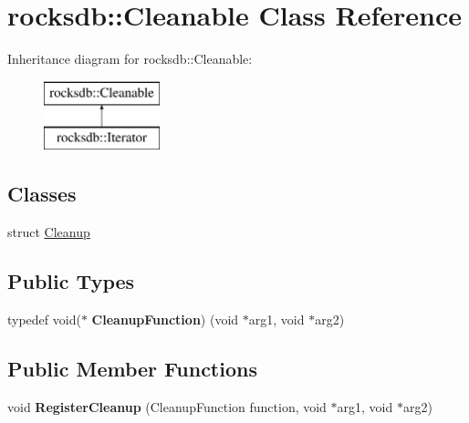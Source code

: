 \hypertarget{classrocksdb_1_1Cleanable}{}\section{rocksdb\+:\+:Cleanable Class Reference}
\label{classrocksdb_1_1Cleanable}
Inheritance diagram for rocksdb\+:\+:Cleanable\+:\begin{figure}[H]
\begin{center}
\leavevmode
\includegraphics[height=2.000000cm]{classrocksdb_1_1Cleanable}
\end{center}
\end{figure}
\subsection*{Classes}
\begin{DoxyCompactItemize}
\item 
struct \hyperlink{structrocksdb_1_1Cleanable_1_1Cleanup}{Cleanup}
\end{DoxyCompactItemize}
\subsection*{Public Types}
\begin{DoxyCompactItemize}
\item 
typedef void($\ast$ {\bfseries Cleanup\+Function}) (void $\ast$arg1, void $\ast$arg2)\hypertarget{classrocksdb_1_1Cleanable_a68bb2c33e6b54bc0e510aecc81095913}{}\label{classrocksdb_1_1Cleanable_a68bb2c33e6b54bc0e510aecc81095913}

\end{DoxyCompactItemize}
\subsection*{Public Member Functions}
\begin{DoxyCompactItemize}
\item 
void {\bfseries Register\+Cleanup} (Cleanup\+Function function, void $\ast$arg1, void $\ast$arg2)\hypertarget{classrocksdb_1_1Cleanable_ac848cc814e5f42f6b5a909a75a12351f}{}\label{classrocksdb_1_1Cleanable_ac848cc814e5f42f6b5a909a75a12351f}

\end{DoxyCompactItemize}
